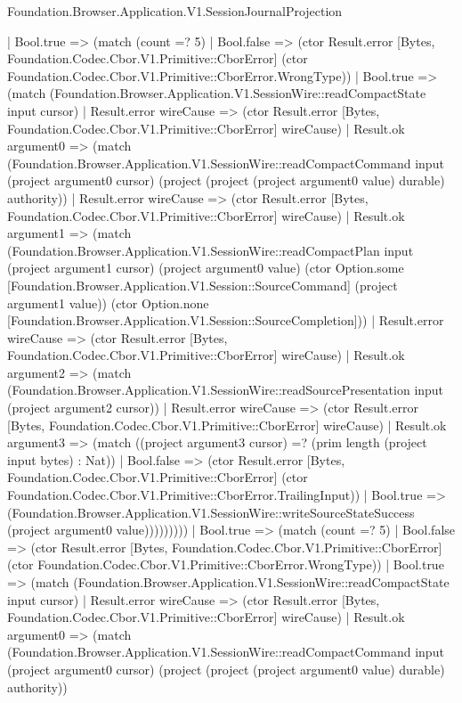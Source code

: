 \begin{lexlean}{Foundation.Browser.Application.V1.SessionJournalProjection}
\begin{semanticmodule}
{        | Bool.true => (match (count =? 5)
          | Bool.false => (ctor Result.error [Bytes, Foundation.Codec.Cbor.V1.Primitive::CborError] (ctor Foundation.Codec.Cbor.V1.Primitive::CborError.WrongType))
          | Bool.true => (match (Foundation.Browser.Application.V1.SessionWire::readCompactState input cursor)
            | Result.error wireCause => (ctor Result.error [Bytes, Foundation.Codec.Cbor.V1.Primitive::CborError] wireCause)
            | Result.ok argument0 => (match (Foundation.Browser.Application.V1.SessionWire::readCompactCommand input (project argument0 cursor) (project (project (project argument0 value) durable) authority))
              | Result.error wireCause => (ctor Result.error [Bytes, Foundation.Codec.Cbor.V1.Primitive::CborError] wireCause)
              | Result.ok argument1 => (match (Foundation.Browser.Application.V1.SessionWire::readCompactPlan input (project argument1 cursor) (project argument0 value) (ctor Option.some [Foundation.Browser.Application.V1.Session::SourceCommand] (project argument1 value)) (ctor Option.none [Foundation.Browser.Application.V1.Session::SourceCompletion]))
                | Result.error wireCause => (ctor Result.error [Bytes, Foundation.Codec.Cbor.V1.Primitive::CborError] wireCause)
                | Result.ok argument2 => (match (Foundation.Browser.Application.V1.SessionWire::readSourcePresentation input (project argument2 cursor))
                  | Result.error wireCause => (ctor Result.error [Bytes, Foundation.Codec.Cbor.V1.Primitive::CborError] wireCause)
                  | Result.ok argument3 => (match ((project argument3 cursor) =? (prim length (project input bytes) : Nat))
                    | Bool.false => (ctor Result.error [Bytes, Foundation.Codec.Cbor.V1.Primitive::CborError] (ctor Foundation.Codec.Cbor.V1.Primitive::CborError.TrailingInput))
                    | Bool.true => (Foundation.Browser.Application.V1.SessionWire::writeSourceStateSuccess (project argument0 value)))))))))
      | Bool.true => (match (count =? 5)
        | Bool.false => (ctor Result.error [Bytes, Foundation.Codec.Cbor.V1.Primitive::CborError] (ctor Foundation.Codec.Cbor.V1.Primitive::CborError.WrongType))
        | Bool.true => (match (Foundation.Browser.Application.V1.SessionWire::readCompactState input cursor)
          | Result.error wireCause => (ctor Result.error [Bytes, Foundation.Codec.Cbor.V1.Primitive::CborError] wireCause)
          | Result.ok argument0 => (match (Foundation.Browser.Application.V1.SessionWire::readCompactCommand input (project argument0 cursor) (project (project (project argument0 value) durable) authority))
}
\end{semanticmodule}
\end{lexlean}
